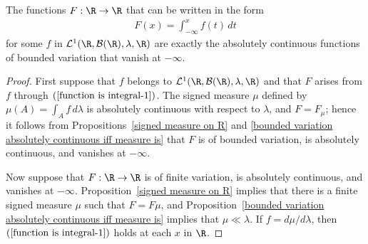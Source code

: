 \begin{proposition}\label{function is integral iff absolutely continuous}
The functions $F:\R\to\R$ that can be written in the form
\begin{align}\label{function is integral-1}
F(x)=\int_{-\infty}^{x}f(t)\,dt
\end{align}
for some $f$ in $\mathcal{L}^1(\R,\mathcal{B}(\R),\lambda,\R)$ are exactly the absolutely continuous functions of bounded variation that vanish at $-\infty$.
\end{proposition}
\begin{proof}
First suppose that $f$ belongs to $\mathcal{L}^1(\R,\mathcal{B}(\R),\lambda,\R)$ and that $F$ arises from $f$ through $(\ref{function is integral-1})$. The signed measure $\mu$ defined by $\mu(A)=\int_Af\,d\lambda$ is absolutely continuous with respect to $\lambda$, and $F=F_\mu$; hence it follows from Propositions~\ref{signed measure on R} and \ref{bounded variation absolutely continuous iff measure is} that $F$ is of bounded variation, is absolutely continuous, and vanishes at $-\infty$.\par
Now suppose that $F:\R\to\R$ is of finite variation, is absolutely continuous, and vanishes at $-\infty$. Proposition~\ref{signed measure on R} implies that there is a finite signed measure $\mu$ such that $F=F\mu$, and Proposition~\ref{bounded variation absolutely continuous iff measure is} implies that $\mu\ll\lambda$. If $f=d\mu/d\lambda$, then $(\ref{function is integral-1})$ holds at each $x$ in $\R$.
\end{proof}
